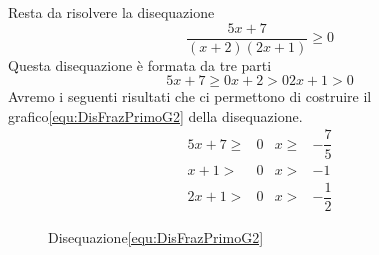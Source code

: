 Resta da risolvere la disequazione
\begin{equation}
\dfrac{5x+7}{(x+2)(2x+1)}\geq 0 \label{equ:DisFrazPrimoG2a}
\end{equation}
Questa disequazione è formata da tre parti 
\begin{subequations}
	\begin{equation}
	5x+7\geq 0\label{equ:DisFrazPrimoG2aP1}
	\end{equation}
	\begin{equation}
	x+2>0\label{equ:DisFrazPrimoG2aP2}
	\end{equation}
	\begin{equation}
	2x+1> 0\label{equ:DisFrazPrimoG2aP3}
	\end{equation}
\end{subequations}
Avremo i seguenti risultati che ci permettono di costruire il grafico\nobs\vref{equ:DisFrazPrimoG2} della disequazione. 
\begin{align*}
	5x+7\geq& 0 & x\geq&-\dfrac{7}{5}\\
	x+1>&0&x>&-1\\
	2x+1>&0&x>&-\dfrac{1}{2}
\end{align*}
\begin{figure}
	\centering
	\captionsetup{format=grafico,list=no}
	\caption[]{Disequazione\nobs\vref{equ:DisFrazPrimoG2}}
	\label{graf:DisFrazPrimoG2}
\end{figure}
